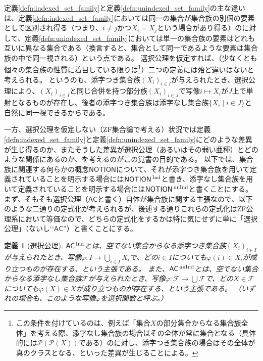 \documentclass{jarticle}
\newtheorem{definition}{定義}
\newcommand{\WithIndex}[1]{$\textrm{#1}{}^{\,\textrm{\scriptsize Ind}}$}
\newcommand{\WithoutIndex}[1]{$\textrm{#1}{}^{\,\textrm{\scriptsize unInd}}$}
\begin{document}
定義\ref{defn:indexed_set_family}と定義\ref{defn:unindexed_set_family}の主な違いは、定義\ref{defn:indexed_set_family}においては同一の集合が集合族の別個の要素として区別され得る（つまり、$i \neq j$かつ$X_i = X_j$という場合があり得る）のに対して、定義\ref{defn:unindexed_set_family}においては単一の集合族の要素はどれも互いに異なる集合である（換言すると、集合として同一であるような要素は集合族の中で同一視される）という点である。
選択公理を仮定すれば、（少なくとも個々の集合族の性質に着目している限りは\footnote{この条件を付けているのは、例えば「集合$X$の部分集合からなる集合族全体」を考える際、添字なし集合族の場合はその全体が常に集合となる（具体的には$\mathcal{P}(\mathcal{P}(X))$である）のに対し、添字つき集合族の場合はその全体が真のクラスとなる、といった差異が生じることによる。}）二つの定義には殆ど違いはないと考えられる。
というのも、添字つき集合族$(X_i)_{i \in I}$が与えられたとき、選択公理により、$(X_i)_{i \in I}$と同じ合併を持つ部分族$(X_i)_{i \in J}$で写像$i \mapsto X_i$が$J$上で単射となるものが存在し、後者の添字つき集合族は添字なし集合族$\{X_i \mid i \in J\}$と自然に同一視できるからである。

一方、選択公理を仮定しない（ZF集合論で考える）状況では定義\ref{defn:indexed_set_family}と定義\ref{defn:unindexed_set_family}にどのような差異が生じ得るのか、またそうした差異が選択公理（あるいはその弱い亜種）とどのような関係にあるのか、を考えるのがこの覚書の目的である。
以下では、集合族に関連する何らかの概念$\mathsf{NOTION}$について、それが添字つき集合族を用いて定義されていることを明示する場合には\WithIndex{$\mathsf{NOTION}$}と書き、添字なし集合族を用いて定義されていることを明示する場合には\WithoutIndex{$\mathsf{NOTION}$}と書くことにする。
まず、そもそも選択公理（$\mathsf{AC}$と書く）自体が集合族に関する主張なので、以下のような二通りの定式化が考えられるが、後述する通りこれらの定式化はZF公理系において等価なので、どちらの定式化をするかは特に気にせずに単に「選択公理」（ないし\lq\lq $\mathsf{AC}$''）と書くことにする。
\begin{definition}
[選択公理]
\WithIndex{$\mathsf{AC}$}とは、空でない集合からなる添字つき集合族$(X_i)_{i \in I}$が与えられたとき、写像$\varphi \colon I \to \bigcup_{i \in I} X_i$で、どの$i \in I$についても$\varphi(i) \in X_i$が成り立つものが存在する、という主張である。
また、\WithoutIndex{$\mathsf{AC}$}とは、空でない集合からなる添字なし集合族$\mathcal{F}$が与えられたとき、写像$\varphi \colon \mathcal{F} \to \bigcup \mathcal{F}$で、どの$X \in \mathcal{F}$についても$\varphi(X) \in X$が成り立つものが存在する、という主張である。
（いずれの場合も、このような写像$\varphi$を選択関数と呼ぶ。）
\end{definition}
\end{document}
